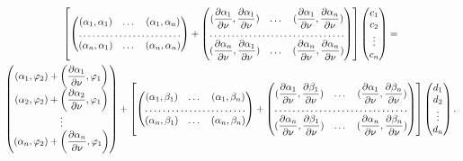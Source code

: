 \documentclass[a4paper]{article}
\begin{document}
\begin{multline}
  \left[
    \begin{pmatrix}
      (\alpha_1,\alpha_1) & \dots & (\alpha_1,\alpha_n) \\
      \hdotsfor{3} \\
      (\alpha_n,\alpha_1) & \dots & (\alpha_n,\alpha_n)
      \end{pmatrix}+
      \begin{pmatrix}
      (\dfrac{\partial\alpha_1}{\partial \nu},\dfrac{\partial\alpha_1}{\partial \nu}) & \dots & (\dfrac{\partial\alpha_1}{\partial \nu},\dfrac{\partial\alpha_n}{\partial \nu}) \\
      \hdotsfor{3} \\
      (\dfrac{\partial\alpha_n}{\partial \nu},\dfrac{\partial\alpha_1}{\partial \nu}) & \dots & (\dfrac{\partial\alpha_n}{\partial \nu},\dfrac{\partial\alpha_n}{\partial \nu})
      \end{pmatrix}
  \right]
\begin{pmatrix}
  c_1\\
  c_2\\
  \vdots\\
  c_n
\end{pmatrix}=\\
\begin{pmatrix}
  (\alpha_1,\varphi_2)+\left(\dfrac{\partial \alpha_1}{\partial \nu},\varphi_1\right)\\
  (\alpha_2,\varphi_2)+\left(\dfrac{\partial \alpha_2}{\partial \nu},\varphi_1\right)\\
  \vdots\\
  (\alpha_n,\varphi_2)+\left(\dfrac{\partial \alpha_n}{\partial \nu},\varphi_1\right)
\end{pmatrix}+
\left[
  \begin{pmatrix}
    (\alpha_1,\beta_1) & \dots & (\alpha_1,\beta_n) \\
    \hdotsfor{3} \\
    (\alpha_n,\beta_1) & \dots & (\alpha_n,\beta_n)
    \end{pmatrix}+
    \begin{pmatrix}
    (\dfrac{\partial\alpha_1}{\partial \nu},\dfrac{\partial\beta_1}{\partial \nu}) & \dots & (\dfrac{\partial\alpha_1}{\partial \nu},\dfrac{\partial\beta_n}{\partial \nu}) \\
    \hdotsfor{3} \\
    (\dfrac{\partial\alpha_n}{\partial \nu},\dfrac{\partial\beta_1}{\partial \nu}) & \dots & (\dfrac{\partial\alpha_n}{\partial \nu},\dfrac{\partial\beta_n}{\partial \nu})
    \end{pmatrix}
\right]
\begin{pmatrix}
  d_1\\
  d_2\\
  \vdots\\
  d_n
\end{pmatrix}.
\end{multline}
\end{document}
